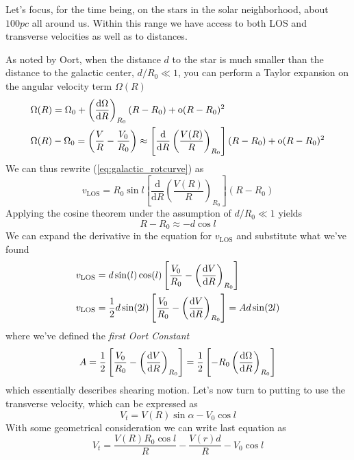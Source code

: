 Let's focus, for the time being, on the stars in the solar neighborhood, about $100\unit{pc}$ all around us. Within this range we have access to both LOS and transverse velocities as well as to distances.
\par As noted by Oort, when the distance $d$ to the star is much smaller than the distance to the galactic center, $d/R_{0} \ll 1$, you can perform a Taylor expansion on the angular velocity term $\Omega(R)$
\begin{align*}
    & \Omega(R) = \Omega_{0} + \left(\frac{\text{d}\Omega}{\text{d}R}\right)_{R_{0}}(R-R_{0})+\text{o}(R-R_{0})^{2}\\
    &  \Omega(R) - \Omega_{0} = \left(\frac{V}{R}-\frac{V_{0}}{R_{0}} \right)\approx \left[\frac{\text{d}}{\text{d}R}\left(\frac{V(R)}{R}\right)_{R_{0}}\right](R-R_{0})+\text{o}(R-R_{0})^{2}
\end{align*}
We can thus rewrite (\ref{eq:galactic_rotcurve}) as 
\begin{equation*}
    v_{\text{LOS}} = R_{0}\sin l\left[\frac{\text{d}}{\text{d}R}\left(\frac{V(R)}{R}\right)_{R_{0}}\right](R-R_{0})
\end{equation*}
Applying the cosine theorem under the assumption of $d/R_{0}\ll 1$ yields
\begin{equation*}
    R-R_{0} \approx -d\cos l
\end{equation*}
We can expand the derivative in the equation for $v_{\text{LOS}}$ and substitute what we've found
\begin{align*}
    & v_{\text{LOS}} = d\sin(l)\cos(l)\left[\frac{V_{0}}{R_{0}}-\left(\frac{\text{d}V}{\text{d}R}\right)_{R_{0}}\right]\\
    & v_{\text{LOS}} = \frac{1}{2}d\sin(2l)\left[\frac{V_{0}}{R_{0}}-\left(\frac{\text{d}V}{\text{d}R}\right)_{R_{0}}\right] = Ad\sin(2l)
\end{align*}
where we've defined the \emph{first Oort Constant}
\begin{equation}
    A = \frac{1}{2}\left[\frac{V_{0}}{R_{0}}-\left(\frac{\text{d}V}{\text{d}R}\right)_{R_{0}}\right] = \frac{1}{2}\left[-R_{0}\left(\frac{\text{d}\Omega}{\text{d}R}\right)_{R_{0}}\right]
    \label{eq:oort_first}
\end{equation}
which essentially describes shearing motion. Let's now turn to putting to use the transverse velocity, which can be expressed as 
\begin{equation*}
    V_{t} = V(R)\sin\alpha - V_{0}\cos l
\end{equation*}
With some geometrical consideration we can write last equation as 
\begin{equation*}
    V_{t} = \frac{V(R)R_{0}\cos l}{R} - \frac{V(r)d}{R} - V_{0}\cos l
\end{equation*}
